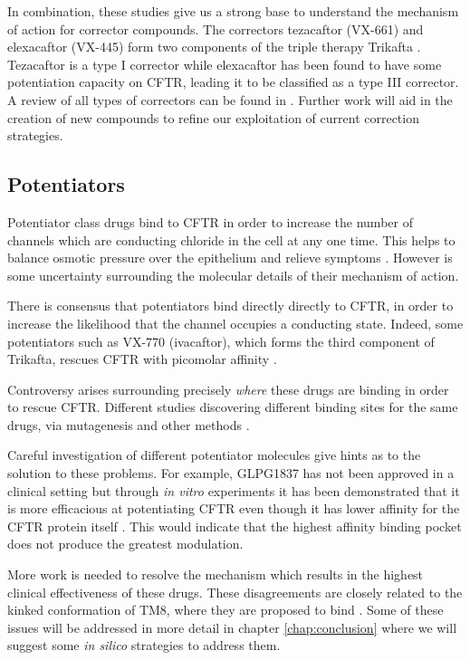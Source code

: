 In combination, these studies give us a strong base to understand the mechanism of action for corrector compounds. The correctors tezacaftor (VX-661) and elexacaftor (VX-445) form two components of the triple therapy Trikafta \cite{administration2021, trikafta_website}. Tezacaftor is a type I corrector while elexacaftor has been found to have some potentiation capacity on CFTR, leading it to be classified as a type III corrector. A review of all types of correctors can be found in \cite{veit2018}. Further work will aid in the creation of new compounds to refine our exploitation of current correction strategies.

\subsection{Potentiators}
Potentiator class drugs bind to CFTR in order to increase the number of channels which are conducting chloride in the cell at any one time. This helps to balance osmotic pressure over the epithelium and relieve symptoms \cite{fda_kalydeco_2_years_or_older, fda_kalydeco_approval, jih2013,yeh2017}. However is some uncertainty surrounding the molecular details of their mechanism of action. 

There is consensus that potentiators bind directly directly to CFTR, in order to increase the likelihood that the channel occupies a conducting state. Indeed, some potentiators such as VX-770 (ivacaftor), which forms the third component of Trikafta, rescues CFTR with picomolar affinity \cite{csanady2019}. 

Controversy arises surrounding precisely \textit{where} these drugs are binding in order to rescue CFTR. Different studies discovering different binding sites for the same drugs, via mutagenesis and other methods \cite{yeh2019, liu2019, laselva2021}.  

Careful investigation of different potentiator molecules give hints as to the solution to these problems. For example, GLPG1837 has not been approved in a clinical setting but through \textit {in vitro} experiments it has been demonstrated that it is more efficacious at potentiating CFTR even though it has lower affinity for the CFTR protein itself \cite{vanderplas2018}. This would indicate that the highest affinity binding pocket does not produce the greatest modulation. 

More work is needed to resolve the mechanism which results in the highest clinical effectiveness of these drugs. These disagreements are closely related to the kinked conformation of TM8, where they are proposed to bind \cite{liu2019, yeh2019}. Some of these issues will be addressed in more detail in chapter \ref{chap:conclusion} where we will suggest some \textit{in silico} strategies to address them. 

